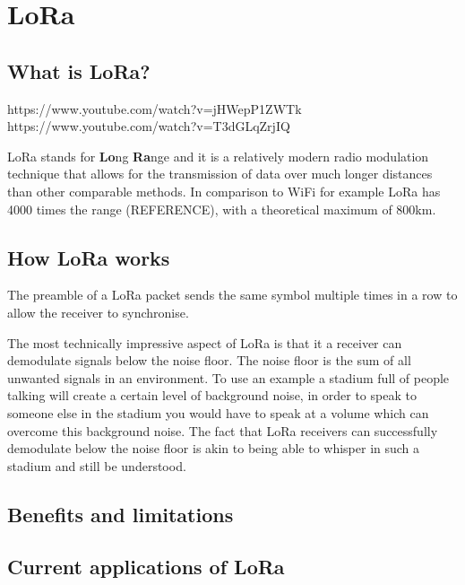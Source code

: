 \section{LoRa}

\subsection{What is LoRa?}

https://www.youtube.com/watch?v=jHWepP1ZWTk
https://www.youtube.com/watch?v=T3dGLqZrjIQ

LoRa stands for \textbf{Lo}ng \textbf{Ra}nge and it is a relatively modern radio
modulation technique that allows for the transmission of data over much longer
distances than other comparable methods. In comparison to WiFi for example LoRa
has 4000 times the range (REFERENCE), with a theoretical maximum of
800km.

\subsection{How LoRa works}

The preamble of a LoRa packet sends the same symbol multiple times in a row to
allow the receiver to synchronise.

The most technically impressive aspect of LoRa is that it a receiver can
demodulate signals below the noise floor. The noise floor is the sum of all
unwanted signals in an environment. To use an example a stadium full of people
talking will create a certain level of background noise, in order to speak to
someone else in the stadium you would have to speak at a volume which can
overcome this background noise. The fact that LoRa receivers can successfully
demodulate below the noise floor is akin to being able to whisper in such a
stadium and still be understood.

\subsection{Benefits and limitations}

\subsection{Current applications of LoRa}